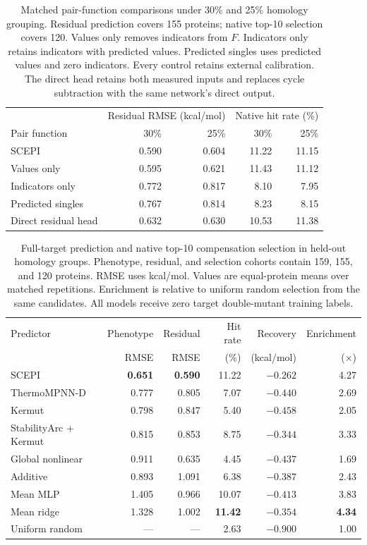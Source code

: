 \documentclass{llncs}
\begin{document}
\begin{table}[!tbp]
\centering
\setlength{\tabcolsep}{4pt}
\caption{Matched pair-function comparisons under 30\% and 25\% homology grouping. Residual prediction covers 155 proteins; native top-10 selection covers 120. Values only removes indicators from $F$. Indicators only retains indicators with predicted values. Predicted singles uses predicted values and zero indicators. Every control retains external calibration. The direct head retains both measured inputs and replaces cycle subtraction with the same network's direct output.}
\label{tab:conditioning}
\begin{tabular}{lrrrr}
\toprule
 & \multicolumn{2}{c}{Residual RMSE (kcal/mol)} & \multicolumn{2}{c}{Native hit rate (\%)} \\
Pair function & 30\% & 25\% & 30\% & 25\% \\
\midrule
SCEPI & 0.590 & 0.604 & 11.22 & 11.15 \\
Values only & 0.595 & 0.621 & 11.43 & 11.12 \\
Indicators only & 0.772 & 0.817 & 8.10 & 7.95 \\
Predicted singles & 0.767 & 0.814 & 8.23 & 8.15 \\
Direct residual head & 0.632 & 0.630 & 10.53 & 11.38 \\
\bottomrule
\end{tabular}
\end{table}

\begin{table}[t]
\centering
\setlength{\tabcolsep}{4pt}
\caption{Full-target prediction and native top-10 compensation selection in held-out homology groups. Phenotype, residual, and selection cohorts contain 159, 155, and 120 proteins. RMSE uses kcal/mol. Values are equal-protein means over matched repetitions. Enrichment is relative to uniform random selection from the same candidates. All models receive zero target double-mutant training labels.}
\label{tab:diagnostic}
\begin{tabular}{lrrrrr}
\toprule
Predictor & Phenotype & Residual & Hit rate & Recovery & Enrichment \\
 & RMSE & RMSE & (\%) & (kcal/mol) & ($\times$) \\
\midrule
SCEPI & \textbf{0.651} & \textbf{0.590} & 11.22 & \textbf{$-0.262$} & 4.27 \\
ThermoMPNN-D & 0.777 & 0.805 & 7.07 & $-0.440$ & 2.69 \\
Kermut & 0.798 & 0.847 & 5.40 & $-0.458$ & 2.05 \\
StabilityArc + Kermut & 0.815 & 0.853 & 8.75 & $-0.344$ & 3.33 \\
Global nonlinear & 0.911 & 0.635 & 4.45 & $-0.437$ & 1.69 \\
Additive & 0.893 & 1.091 & 6.38 & $-0.387$ & 2.43 \\
Mean MLP & 1.405 & 0.966 & 10.07 & $-0.413$ & 3.83 \\
Mean ridge & 1.328 & 1.002 & \textbf{11.42} & $-0.354$ & \textbf{4.34} \\
Uniform random & --- & --- & 2.63 & $-0.900$ & 1.00 \\
\bottomrule
\end{tabular}
\end{table}
\end{document}
